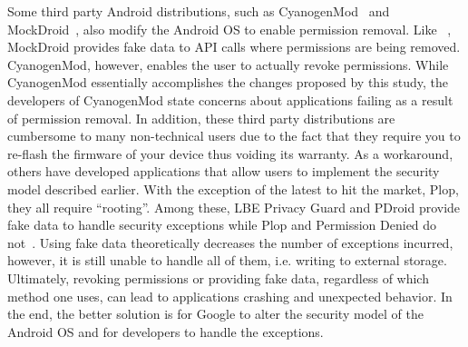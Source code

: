 Some third party Android distributions, such as CyanogenMod~\cite{Demers} and MockDroid~\cite{Beresford:2011:MTP:2184489.2184500}, also modify the Android OS to enable permission removal. Like ~\cite{Hornyack:2011:TAD:2046707.2046780}, MockDroid provides fake data to API calls where permissions are being removed. CyanogenMod, however, enables the user to actually revoke permissions. While CyanogenMod essentially accomplishes the changes proposed by this study, the developers of CyanogenMod state concerns about applications failing as a result of permission removal. In addition, these third party distributions are cumbersome to many non-technical users due to the fact that they require you to re-flash the firmware of your device thus voiding its warranty. As a workaround, others have developed applications that allow users to implement the security model described earlier. With the exception of the latest to hit the market, Plop, they all require “rooting”. Among these, LBE Privacy Guard and PDroid provide fake data to handle security exceptions while Plop and Permission Denied do not~\cite{Hoffman}. Using fake data theoretically decreases the number of exceptions incurred, however, it is still unable to handle all of them, i.e. writing to external storage. Ultimately, revoking permissions or providing fake data, regardless of which method one uses, can lead to applications crashing and unexpected behavior. In the end, the better solution is for Google to alter the security model of the Android OS and for developers to handle the exceptions. 
